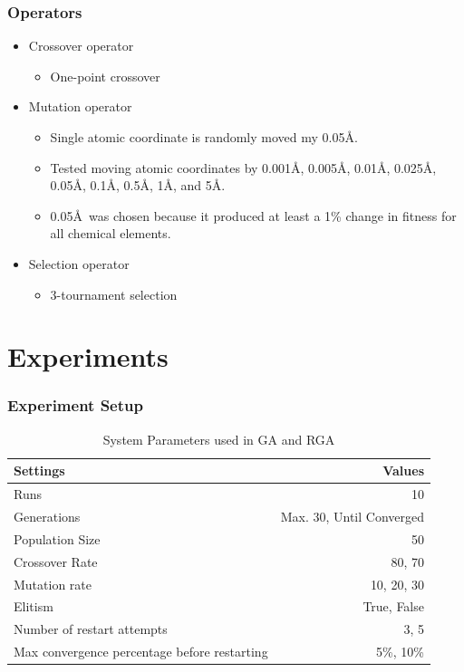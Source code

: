 \documentclass[10pt]{beamer}
\begin{document}
\begin{frame}
	\frametitle{Operators}

	\begin{itemize}
		\item Crossover operator
			\begin{itemize}
				\item One-point crossover
			\end{itemize}
		\item Mutation operator
			\begin{itemize}
				\item Single atomic coordinate is randomly moved my 0.05\AA.
				\item Tested moving atomic coordinates by 0.001\AA, 0.005\AA, 0.01\AA, 0.025\AA, 0.05\AA, 0.1\AA, 0.5\AA, 1\AA, and 5\AA.
				\item 0.05\AA\ was chosen because it produced at least a 1\% change in fitness for all chemical elements.
			\end{itemize}
		\item Selection operator
			\begin{itemize}
				\item 3-tournament selection
			\end{itemize}
	\end{itemize}

\end{frame}

\section{Experiments}

\begin{frame}
	\frametitle{Experiment Setup}

	\begin{table}
		\caption{System Parameters used in GA and RGA}
		\begin{tabular}{ | l | r | }
		  \hline
		    Settings & Values \\ \hline \hline
		    Runs & 10 \\ \hline
		    Generations & Max. 30, Until Converged \\ \hline
		    Population Size & 50 \\ \hline
		    Crossover Rate & 80, 70 \\ \hline
		    Mutation rate & 10, 20, 30 \\ \hline
		    Elitism & True, False \\ \hline
		    Number of restart attempts & 3, 5 \\ \hline
		    Max convergence percentage before restarting & 5\%, 10\% \\ \hline
		\end{tabular}
	\end{table}
\end{frame}
\end{document}
